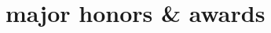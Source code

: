 \documentclass[__VERSION__]{friggeri-cv} %
\begin{document}
\begin{entrylist}
\end{entrylist}






\section{major honors \& awards}
\end{document}
